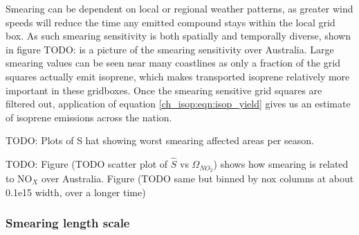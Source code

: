     
    
    
    
    Smearing can be dependent on local or regional weather patterns, as greater wind speeds will reduce the time any emitted compound stays within the local grid box.
    As such smearing sensitivity is both spatially and temporally diverse, shown in figure TODO: is a picture of the smearing sensitivity over Australia.
    Large smearing values can be seen near many coastlines as only a fraction of the grid squares actually emit isoprene, which makes transported isoprene relatively more important in these gridboxes.
    Once the smearing sensitive grid squares are filtered out, application of equation \ref{ch_isop:eqn:isop_yield} gives us an estimate of isoprene emissions across the nation.
    
    TODO: Plots of S hat showing worst smearing affected areas per season.
    
    TODO: Figure (TODO scatter plot of $\hat{S}$ vs $\Omega_{NO_2}$) shows how smearing is related to NO$_X$ over Australia.
    Figure (TODO same but binned by nox columns at about 0.1e15 width, over a longer time)
    
    \subsubsection{Smearing length scale}
    
